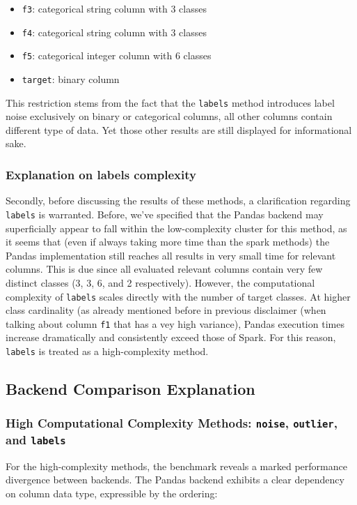 \documentclass[../main.tex]{subfiles}
\begin{document}
\begin{itemize}
    \item \texttt{f3}: categorical string column with 3 classes
    \item \texttt{f4}: categorical string column with 3 classes
    \item \texttt{f5}: categorical integer column with 6 classes
    \item \texttt{target}: binary column
\end{itemize}

This restriction stems from the fact that the \texttt{labels} method introduces label noise exclusively on binary or categorical columns, all other columns contain different type of data. Yet those other results are still displayed for informational sake.

\subsubsection{Explanation on labels complexity}
Secondly, before discussing the results of these methods, a clarification regarding \texttt{labels} is warranted. Before, we've specified that the Pandas backend may superficially appear to fall within the low-complexity cluster for this method, as it seems that (even if always taking more time than the spark methods) the Pandas implementation still reaches all results in very small time for relevant columns.
This is due since all evaluated relevant columns contain very few distinct classes (3, 3, 6, and 2 respectively). However, the computational complexity of \texttt{labels} scales directly with the number of target classes. At higher class cardinality (as already mentioned before in previous disclaimer (when talking about column \texttt{f1} that has a vey high variance), Pandas execution times increase dramatically and consistently exceed those of Spark. For this reason, \texttt{labels} is treated as a high-complexity method.


\newpage
\subsection{Backend Comparison Explanation}
\label{sec:Backend Comparison Explanation}
\subsubsection{High Computational Complexity Methods: \texttt{noise}, \texttt{outlier}, and \texttt{labels}}
For the high-complexity methods, the benchmark reveals a marked performance divergence between backends. The Pandas backend exhibits a clear dependency on column data type, expressible by the ordering:
\end{document}
